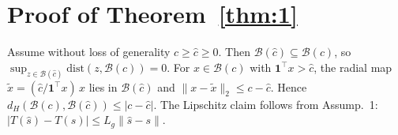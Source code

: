 \section{Proof of Theorem~\ref{thm:1}}
\label{app:thm1}

Assume without loss of generality $c\ge\hat c\ge 0$. Then $\mathcal{B}(\hat c)\subseteq\mathcal{B}(c)$, so
$\sup_{z\in\mathcal{B}(\hat c)}\mathrm{dist}(z,\mathcal{B}(c))=0$.
For $x\in\mathcal{B}(c)$ with $\mathbf{1}^\top x>\hat c$, the radial map
$\tilde x=(\hat c/\mathbf{1}^\top x)\,x$ lies in $\mathcal{B}(\hat c)$ and
$\|x-\tilde x\|_2\le c-\hat c$.
Hence $d_H(\mathcal{B}(c),\mathcal{B}(\hat c))\le\lvert c-\hat c\rvert$.
The Lipschitz claim follows from Assump.~1: $\lvert T(\hat s)-T(s)\rvert\le L_g\|\hat s-s\|$.
